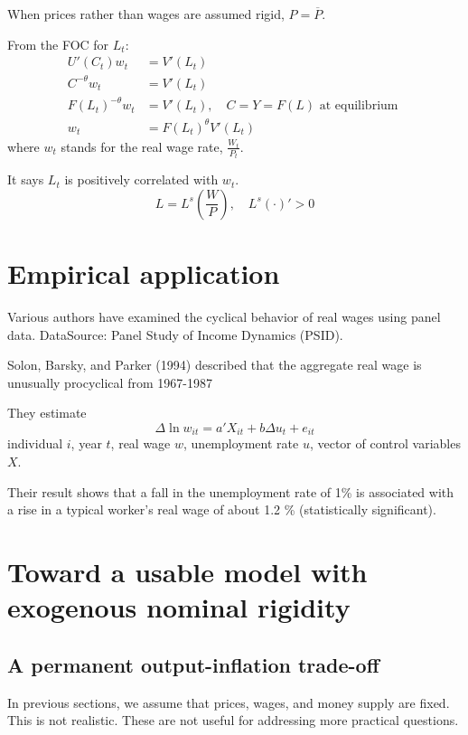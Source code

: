 \documentclass[12pt]{article}
\begin{document}
When prices rather than wages are assumed rigid, $ P =  \overline{P} $.

From the FOC for $ L_{t} $:
\begin{align*}
U'(C_{t})w_{t} &= V'(L_{t})\\
C^{ - \theta}w_{t}&= V'(L_{t})\\
F(L_{t})^{ - \theta}w_{t}&= V'(L_{t}), \quad C = Y = F(L) \text{ at equilibrium }\\
w_{t}&= F(L_{t})^{\theta}V'(L_{t})
\end{align*}
where $ w_{t} $ stands for the real wage rate, $ \frac{W_{t}}{P_{t}} $.

It says $ L_{t} $ is positively correlated with $ w_{t} $.
\begin{equation*}
L = L^{s}\left( \frac{W}{P} \right) , \quad L^{s}(\cdot )' > 0
\end{equation*}




\section{Empirical application}
Various authors have examined the cyclical behavior of real wages using panel data.
DataSource: Panel Study of Income Dynamics (PSID).

Solon, Barsky, and Parker (1994) described that the aggregate real wage is unusually
procyclical from 1967-1987

They estimate
\begin{equation*}
\Delta \ln w_{it} = a'X_{it} + b \Delta u_{t} + e_{it}
\end{equation*}
individual $ i $, year $ t $, real wage $ w $, unemployment rate $ u $, vector of 
control variables $ X $.

Their result shows that a fall in the unemployment rate of 1\% is associated with a rise
in a typical worker's real wage of about 1.2 \% (statistically significant).


\section{Toward a usable model with exogenous nominal rigidity}
\subsection{A permanent output-inflation trade-off}
In previous sections, we assume that prices, wages, and money supply are fixed.
This is not realistic. These are not useful for addressing more practical questions.
\end{document}
